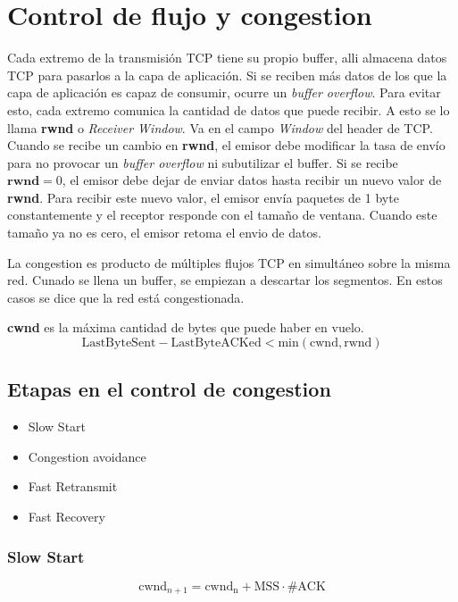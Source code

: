 \documentclass[titlepage,a4paper]{article}
\begin{document}
\section{Control de flujo y congestion}

Cada extremo de la transmisión TCP tiene su propio buffer, alli almacena datos TCP para pasarlos a la capa de aplicación. Si se reciben más datos de los que la capa de aplicación es capaz de consumir, ocurre un \textit{buffer overflow}. Para evitar esto, cada extremo comunica la cantidad de datos que puede recibir. A esto se lo llama \textbf{rwnd} o \textit{Receiver Window}. Va en el campo \textit{Window} del header de TCP.
Cuando se recibe un cambio en \textbf{rwnd}, el emisor debe modificar la tasa de envío para no provocar un \textit{buffer overflow} ni subutilizar el buffer. 
Si se recibe $\textbf{rwnd} = 0 $, el emisor debe dejar de enviar datos hasta recibir un nuevo valor de \textbf{rwnd}. Para recibir este nuevo valor, el emisor envía paquetes de 1 byte constantemente y el receptor responde con el tamaño de ventana. Cuando este tamaño ya no es cero, el emisor retoma el envio de datos.

La congestion es producto de múltiples flujos TCP en simultáneo sobre la misma red. Cunado se llena un buffer, se empiezan a descartar los segmentos. En estos casos se dice que la red está congestionada.

\textbf{cwnd} es la máxima cantidad de bytes que puede haber en vuelo.
$$ \mathrm{LastByteSent}-\mathrm{LastByteACKed} < \mathrm{min}(\mathrm{cwnd},\mathrm{rwnd}) $$


\subsection{Etapas en el control de congestion}

\begin{itemize}
    \item Slow Start
    \item Congestion avoidance
    \item Fast Retransmit
    \item Fast Recovery
\end{itemize}

\subsubsection{Slow Start}

$$\mathrm{cwnd}_{n+1} = \mathrm{cwnd_n} + \mathrm{MSS} \cdot \#\mathrm{ACK} $$
\end{document}
